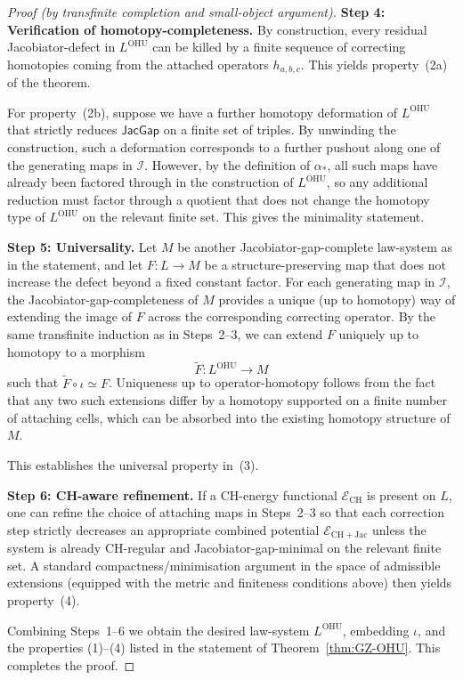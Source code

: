 \documentclass[11pt]{book}
\theoremstyle{plain}
\theoremstyle{definition}
\begin{document}
\begin{proof}[Proof (by transfinite completion and small-object argument)]
\medskip\noindent
\textbf{Step 4: Verification of homotopy-completeness.}
By construction, every residual \\ Jacobiator-defect in
\(L^{\mathrm{OHU}}\) can be killed by a finite sequence of correcting
homotopies coming from the attached operators \(h_{a,b,c}\).  This
yields property~(2a) of the theorem.

For property~(2b), suppose we have a further homotopy deformation of
\(L^{\mathrm{OHU}}\) that strictly reduces \(\mathsf{JacGap}\) on a
finite set of triples.  By unwinding the construction, such a
deformation corresponds to a further pushout along one of the
generating maps in \(\mathcal{I}\).  However, by the definition of
\(\alpha_*\), all such maps have already been factored through in the
construction of \(L^{\mathrm{OHU}}\), so any additional reduction must
factor through a quotient that does not change the homotopy type of
\(L^{\mathrm{OHU}}\) on the relevant finite set.  This gives the
minimality statement.



\medskip\noindent
\textbf{Step 5: Universality.}
Let \(M\) be another Jacobiator-gap-complete law-system as in the
statement, and let \(F : L\to M\) be a structure-preserving map that
does not increase the defect beyond a fixed constant factor.  For each
generating map in \(\mathcal{I}\), the Jacobiator-gap-completeness of
\(M\) provides a unique (up to homotopy) way of extending the image of
\(F\) across the corresponding correcting operator.  By the same
transfinite induction as in Steps~2–3, we can extend \(F\) uniquely up
to homotopy to a morphism
\[
  \widetilde{F} : L^{\mathrm{OHU}}\to M
\]
such that \(\widetilde{F}\circ\iota\simeq F\).  Uniqueness up to
operator-homotopy follows from the fact that any two such extensions
differ by a homotopy supported on a finite number of attaching cells,
which can be absorbed into the existing homotopy structure of \(M\).

This establishes the universal property in~(3).



\medskip\noindent
\textbf{Step 6: CH-aware refinement.}
If a CH-energy functional \(\mathcal{E}_{\mathrm{CH}}\) is present on
\(L\), one can refine the choice of attaching maps in Steps~2–3 so
that each correction step strictly decreases an appropriate combined
potential \(\mathcal{E}_{\mathrm{CH+Jac}}\) unless the system is
already CH-regular and Jacobiator-gap-minimal on the relevant finite
set.  A standard compactness/minimisation argument in the space of
admissible extensions (equipped with the metric and finiteness
conditions above) then yields property~(4).



\medskip
Combining Steps~1–6 we obtain the desired law-system
\(L^{\mathrm{OHU}}\), embedding \(\iota\), and the properties
\textnormal{(1)}–\textnormal{(4)} listed in the statement of
Theorem~\ref{thm:GZ-OHU}.  This completes the proof.
\end{proof}
\end{document}
